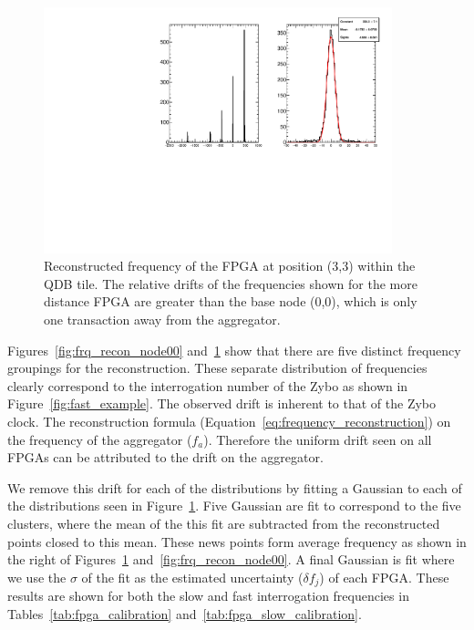 \begin{figure}[]
\centering
\includegraphics[width=0.9\textwidth]{images/(3,3).pdf}
\caption{Reconstructed frequency of the FPGA at position (3,3) within the QDB tile.
The relative drifts of the frequencies shown for the more distance FPGA are greater than the base node (0,0), which is only one transaction away from the aggregator.
}
\label{fig:frq_recon_node33}
\end{figure}


Figures~\ref{fig:frq_recon_node00} and~\ref{fig:frq_recon_node33} show that there are five distinct frequency groupings for the reconstruction.
These separate distribution of frequencies clearly correspond to the interrogation number of the Zybo as shown in Figure~\ref{fig:fast_example}.
The observed drift is inherent to that of the Zybo clock.
The reconstruction formula (Equation~\ref{eq:frequency_reconstruction}) on the frequency of the aggregator ($f_{a}$).
Therefore the uniform drift seen on all FPGAs can be attributed to the drift on the aggregator.

We remove this drift for each of the distributions by fitting a Gaussian to each of the distributions seen in Figure~\ref{fig:frq_recon_node33}.
Five Gaussian are fit to correspond to the five clusters, where the mean of the this fit are subtracted from the reconstructed points closed to this mean.
These news points form average frequency as shown in the right of Figures~\ref{fig:frq_recon_node33} and~\ref{fig:frq_recon_node00}.
A final Gaussian is fit where we use the $\sigma$ of the fit as the estimated uncertainty ($\delta f_{j}$) of each FPGA.
These results are shown for both the slow and fast interrogation frequencies in Tables~\ref{tab:fpga_calibration} and~\ref{tab:fpga_slow_calibration}.


